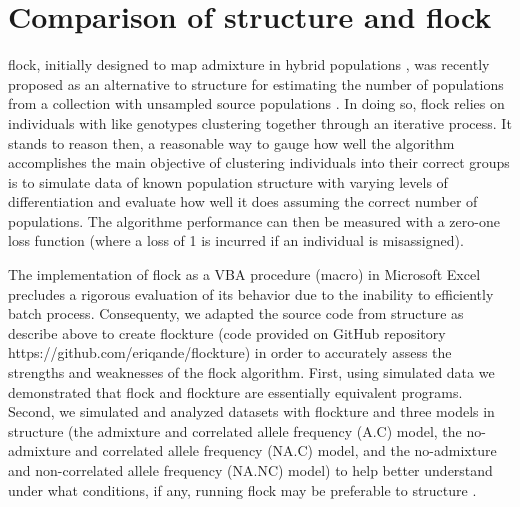 \section*{Comparison of {\sc structure} and {\sc flock}}
{\sc flock}, initially designed to map admixture in hybrid populations 
\citep{Duc&Tur2009}, was recently proposed as an alternative to 
{\sc structure} for estimating the number of populations from a collection with 
unsampled source populations \citep{Duc&Tur2012}. In doing so, 
{\sc flock} relies on individuals with like genotypes clustering together 
through an iterative process. It stands to reason then, a reasonable way 
to gauge how well the algorithm accomplishes the main objective 
of clustering individuals into their correct groups is to simulate data of known 
population structure with varying levels of differentiation and 
evaluate how well it does assuming the correct number of populations. The 
algorithme performance can then be measured with a zero-one 
loss function (where a loss of 1 is incurred if an individual is misassigned).

The implementation of {\sc flock} as a VBA procedure (macro) in 
Microsoft Excel precludes a rigorous evaluation of its behavior due 
to the inability to efficiently batch process. Consequenty, we adapted 
the source code from {\sc structure} as describe above to create {\sc flockture}
(code provided on GitHub repository https://github.com/eriqande/flockture) 
in order to accurately assess the strengths and weaknesses of the {\sc flock} 
algorithm. First, using simulated data we demonstrated that {\sc flock} 
and {\sc flockture} are essentially equivalent programs.
Second, we simulated and analyzed datasets with {\sc flockture} 
and three models in {\sc structure} (the admixture and correlated 
allele frequency (A.C) model, the no-admixture and correlated 
allele frequency (NA.C) model, and the no-admixture and non-correlated 
allele frequency (NA.NC) model) to help better understand
under what conditions, if any, running {\sc flock} may be preferable to {\sc structure} . 

